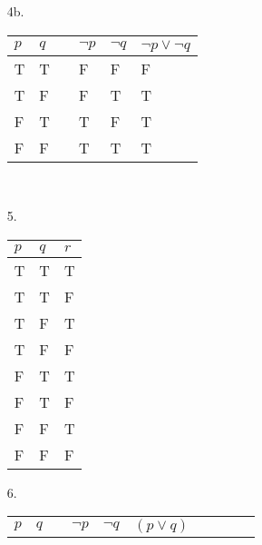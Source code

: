 {\begin{enumerate}
        \item[4b.]
            \begin{tabular}{ | p{1cm} | p{1cm} | c | p{2cm} | p{2cm} | p{3cm} | }
                \hline
                $p$ & $q$ & & $\neg p$ & $\neg q$ & $\neg p \lor \neg q$ \\ \hline
                T & T &
                &  F 
                &  F 
                &  F 
                \\ \hline
                T & F &
                &  F 
                &  T 
                &  T 
                \\ \hline
                F & T &
                &  T 
                &  F 
                &  T 
                \\ \hline
                F & F &
                &  T 
                &  T 
                &  T 
                \\ \hline
            \end{tabular} ~\\

    \item[5.]
        \begin{tabular}{ | p{2cm} | p{2cm} | p{2cm} | }
            \hline
            $p$ & $q$ & $r$
            \\ \hline
            T & T & T
            \\ \hline
            T & T & F
            \\ \hline
            T &  F  &  T 
            \\ \hline
            T & F & F
            \\ \hline
            F &  T  &  T 
            \\ \hline
            F &  T  &  F 
            \\ \hline
            F &  F  &  T 
            \\ \hline
            F & F & F
            \\ \hline
        \end{tabular}

    \item[6.]
        \begin{tabular}{ | c | c | c | c |  c | c | c | c | c | c | }
            \hline
                $p$ &
                $q$ & &

                $\neg p$ &
                $\neg q$ &

                $(p \lor q)$ & &


\end{tabular}
\end{enumerate}}
